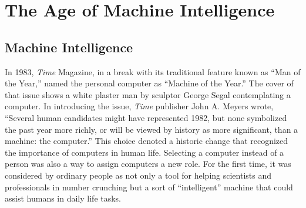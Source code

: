 




%

\setcounter{chapter}{3}

\chapter{\label{chap:4}The Age of Machine Intelligence}



\section{\label{sec:4.1}Machine Intelligence}

In 1983, \textit{Time} Magazine, in a break with its traditional feature known as ``Man of the Year,'' named the personal computer as ``Machine of the Year.'' The cover of that issue shows a white plaster man by sculptor George Segal contemplating a computer. In introducing the issue, \textit{Time} publisher John A. Meyers wrote, ``Several human candidates might have represented 1982, but none symbolized the past year more richly, or will be viewed by history as more significant, than a machine: the computer.'' This choice denoted a historic change that recognized the importance of computers in human life. Selecting a computer instead of a person was also a way to assign computers a new role. For the first time, it was considered by ordinary people as not only a tool for helping scientists and professionals in \hbox{number} crunching but a sort of ``intelligent'' machine that could assist humans in daily life tasks.

